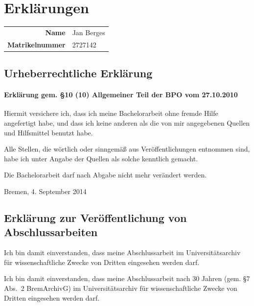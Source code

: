 \documentclass[a4paper, 10pt, twoside, openany]{book} %
\begin{document}
	\chapter{Erklärungen}
	
	\bigskip
	
	\begin{flushright}
		\begin{tabular}{r l}
			\textbf{Name} & Jan Berges \\
			\textbf{Matrikelnummer} & 2727142
		\end{tabular}
	\end{flushright}
	
	\bigskip
	
	\section*{Urheberrechtliche Erklärung}

	\subsubsection*{Erklärung gem. \S 10 (10) Allgemeiner Teil der BPO vom 27.10.2010}
	
	Hiermit versichere ich, dass ich meine Bachelorarbeit ohne fremde Hilfe angefertigt habe, und dass ich keine anderen als die von mir angegebenen Quellen und Hilfsmittel benutzt habe.
	
	Alle Stellen, die wörtlich oder sinngemäß aus Veröffentlichungen entnommen sind, habe ich unter Angabe der Quellen als solche kenntlich gemacht.

	Die Bachelorarbeit darf nach Abgabe nicht mehr verändert werden.
	
	\vspace{1cm}

	\begin{flushright}
		Bremen, 4. September 2014
	\end{flushright}
	
	\vspace{1cm}
	
	\section*{Erklärung zur Veröffentlichung von Abschlussarbeiten}

	Ich bin damit einverstanden, dass meine Abschlussarbeit im Universitätsarchiv für wissenschaftliche Zwecke von Dritten eingesehen werden darf.
	
	Ich bin damit einverstanden, dass meine Abschlussarbeit nach 30 Jahren (gem. \S 7 Abs.~2 \mbox{BremArchivG}) im Universitätsarchiv für wissenschaftliche Zwecke von Dritten eingesehen werden darf.
	
\end{document}
